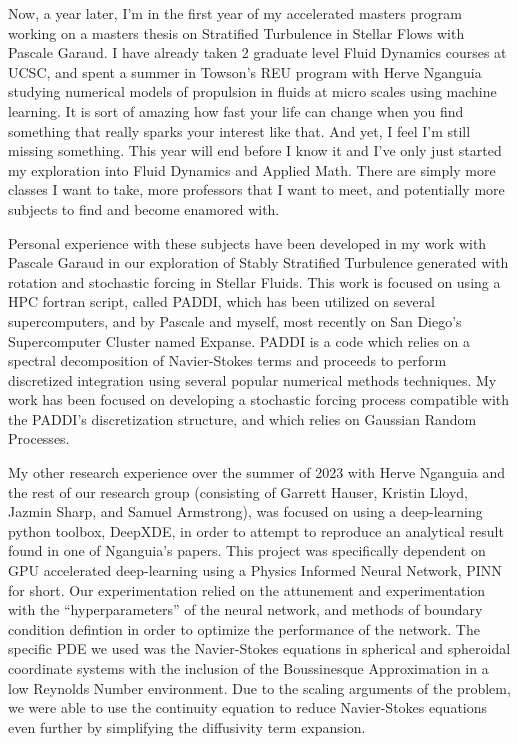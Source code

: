\documentclass{article}
\begin{document}
Now, a year later, I'm in the first year of my accelerated masters program working on a masters thesis on Stratified Turbulence in Stellar Flows with Pascale Garaud. I have already taken 2 graduate level Fluid Dynamics courses at UCSC, and spent a summer in Towson's REU program with Herve Nganguia studying numerical models of propulsion in fluids at micro scales using machine learning. It is sort of amazing how fast your life can change when you find something that really sparks your interest like that. And yet, I feel I'm still missing something. This year will end before I know it and I've only just started my exploration into Fluid Dynamics and Applied Math. There are simply more classes I want to take, more professors that I want to meet, and potentially more subjects to find and become enamored with.
 
Personal experience with these subjects have been developed in my work with Pascale Garaud in our exploration of Stably Stratified Turbulence generated with rotation and stochastic forcing in Stellar Fluids. This work is focused on using a HPC fortran script, called PADDI, which has been utilized on several supercomputers, and by Pascale and myself, most recently on San Diego's Supercomputer Cluster named Expanse. PADDI is a code which relies on a spectral decomposition of Navier-Stokes terms and proceeds to perform discretized integration using several popular numerical methods techniques. My work has been focused on developing a stochastic forcing process compatible with the PADDI's discretization structure, and which relies on Gaussian Random Processes. 

My other research experience over the summer of 2023 with Herve Nganguia and the rest of our research group (consisting of Garrett Hauser, Kristin Lloyd, Jazmin Sharp, and Samuel Armstrong), was focused on using a deep-learning python toolbox, DeepXDE, in order to attempt to reproduce an analytical result found in one of Nganguia's papers. This project was specifically dependent on GPU accelerated deep-learning using a Physics Informed Neural Network, PINN for short. Our experimentation relied on the attunement and experimentation with the ``hyperparameters'' of the neural network, and methods of boundary condition defintion in order to optimize the performance of the network. The specific PDE we used was the Navier-Stokes equations in spherical and spheroidal coordinate systems with the inclusion of the Boussinesque Approximation in a low Reynolds Number environment. Due to the scaling arguments of the problem, we were able to use the continuity equation to reduce Navier-Stokes equations even further by simplifying the diffusivity term expansion.
\end{document}
